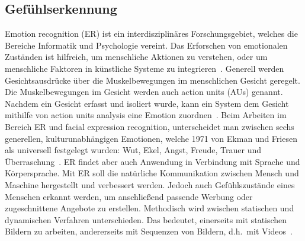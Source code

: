 \subsection{Gefühlserkennung}
Emotion recognition (ER) ist ein interdisziplinäres Forschungsgebiet, welches die Bereiche Informatik und Psychologie vereint. Das Erforschen von emotionalen Zuständen ist hilfreich, um menschliche Aktionen zu verstehen, oder um menschliche Faktoren in künstliche Systeme zu integrieren~\cite{eyetrackemotionrec}.
Generell werden Gesichtsausdrücke über die Muskelbewegungen im menschlichen Gesicht geregelt. Die Muskelbewegungen im Gesicht werden auch action units (AUs) genannt. Nachdem ein Gesicht erfasst und isoliert wurde, kann ein System dem Gesicht mithilfe von action units analysis eine Emotion zuordnen~\cite{wildemotionrec}.
Beim Arbeiten im Bereich ER und facial expression recognition, unterscheidet man zwischen sechs generellen, kulturunabhängigen Emotionen, welche 1971 von Ekman und Friesen als universell festgelegt wurden: Wut, Ekel, Angst, Freude, Trauer und Überraschung~\cite{cnnemotionrec}. ER findet aber auch Anwendung in Verbindung mit Sprache und Körpersprache. Mit ER soll die natürliche Kommunikation zwischen Mensch und Maschine hergestellt und verbessert werden. Jedoch auch Gefühlszustände eines Menschen erkannt werden, um anschließend passende Werbung oder zugeschnittene Angebote zu erstellen. Methodisch wird zwischen statischen und dynamischen Verfahren unterschie\-den. Das bedeutet, einerseits mit statischen Bildern zu arbeiten, andererseits mit Sequenzen von Bildern, d.h.~mit Videos~\cite{facialemotionrecusingcnn}.
\\
